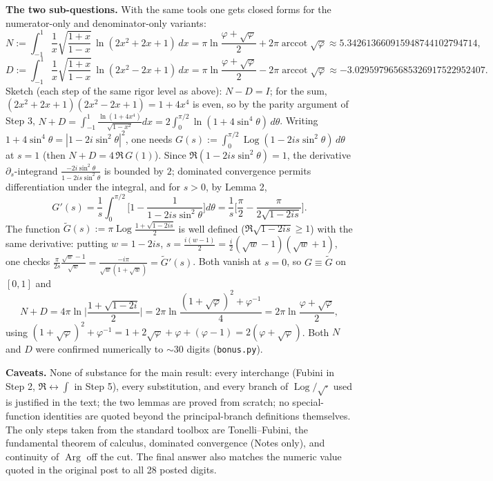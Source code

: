 \documentclass[11pt]{article}
\theoremstyle{remark}
\begin{document}
\textbf{The two sub-questions.} With the same tools one gets closed forms for the numerator-only and denominator-only variants:
$$N:=\int_{-1}^1\frac1x\sqrt{\frac{1+x}{1-x}}\,\ln(2x^2+2x+1)\,dx
=\pi\ln\frac{\varphi+\sqrt\varphi}{2}+2\pi\operatorname{arccot}\sqrt\varphi\approx 5.342613660915948744102794714,$$
$$D:=\int_{-1}^1\frac1x\sqrt{\frac{1+x}{1-x}}\,\ln(2x^2-2x+1)\,dx
=\pi\ln\frac{\varphi+\sqrt\varphi}{2}-2\pi\operatorname{arccot}\sqrt\varphi\approx-3.029597965685326917522952407 .$$
Sketch (each step of the same rigor level as above): $N-D=I$; for the sum, $(2x^2+2x+1)(2x^2-2x+1)=1+4x^4$ is even, so by the parity argument of Step 3, $N+D=\int_{-1}^1\frac{\ln(1+4x^4)}{\sqrt{1-x^2}}dx=2\int_0^{\pi/2}\ln(1+4\sin^4\theta)\,d\theta$. Writing $1+4\sin^4\theta=|1-2i\sin^2\theta|^2$, one needs $G(s):=\int_0^{\pi/2}\operatorname{Log}(1-2is\sin^2\theta)\,d\theta$ at $s=1$ (then $N+D=4\,\Re\,G(1)$). Since $\Re(1-2is\sin^2\theta)=1$, the derivative $\partial_s$-integrand $\frac{-2i\sin^2\theta}{1-2is\sin^2\theta}$ is bounded by $2$; dominated convergence permits differentiation under the integral, and for $s>0$, by Lemma 2,
$$G'(s)=\frac1s\int_0^{\pi/2}\Big[1-\frac{1}{1-2is\sin^2\theta}\Big]d\theta=\frac1s\Big[\frac\pi2-\frac{\pi}{2\sqrt{1-2is}}\Big].$$
The function $\widetilde G(s):=\pi\operatorname{Log}\frac{1+\sqrt{1-2is}}{2}$ is well defined ($\Re\sqrt{1-2is}\ge1$) with the same derivative: putting $w=1-2is$, $s=\frac{i(w-1)}2=\frac i2(\sqrt w-1)(\sqrt w+1)$, one checks $\frac{\pi}{2s}\frac{\sqrt w-1}{\sqrt w}=\frac{-i\pi}{\sqrt w(1+\sqrt w)}=\widetilde G'(s)$. Both vanish at $s=0$, so $G\equiv\widetilde G$ on $[0,1]$ and
$$N+D=4\pi\ln\Big|\frac{1+\sqrt{1-2i}}{2}\Big|=2\pi\ln\frac{(1+\sqrt\varphi)^2+\varphi^{-1}}{4}=2\pi\ln\frac{\varphi+\sqrt\varphi}{2},$$
using $(1+\sqrt\varphi)^2+\varphi^{-1}=1+2\sqrt\varphi+\varphi+(\varphi-1)=2(\varphi+\sqrt\varphi)$. Both $N$ and $D$ were confirmed numerically to $\sim30$ digits (\texttt{bonus.py}).

\textbf{Caveats.} None of substance for the main result: every interchange (Fubini in Step 2, $\Re\leftrightarrow\int$ in Step 5), every substitution, and every branch of $\operatorname{Log}/\sqrt{\cdot}$ used is justified in the text; the two lemmas are proved from scratch; no special-function identities are quoted beyond the principal-branch definitions themselves. The only steps taken from the standard toolbox are Tonelli--Fubini, the fundamental theorem of calculus, dominated convergence (Notes only), and continuity of $\operatorname{Arg}$ off the cut. The final answer also matches the numeric value quoted in the original post to all 28 posted digits.
\end{document}
